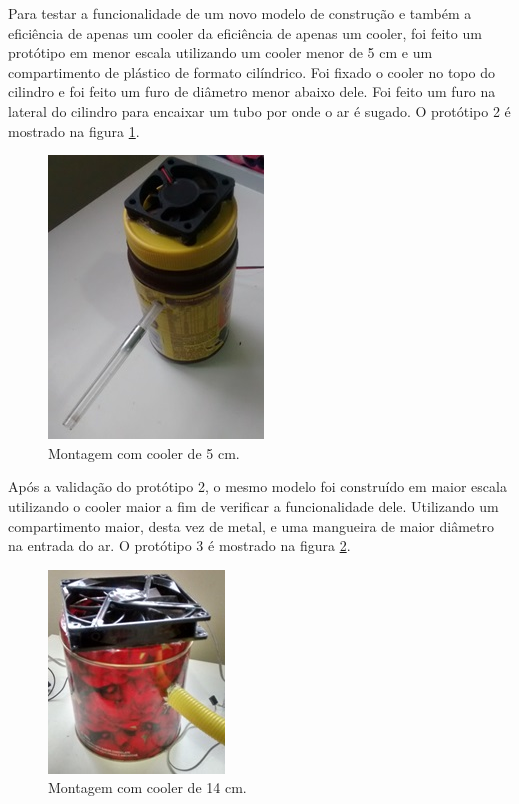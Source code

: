 		Para testar a funcionalidade de um novo modelo de construção e também a eficiência de apenas um cooler da eficiência de apenas um cooler, foi feito um protótipo em menor escala utilizando um cooler menor de 5 cm e um compartimento de plástico de formato cilíndrico. Foi fixado o cooler no topo do cilindro e foi feito um furo de diâmetro menor abaixo dele. Foi feito um furo na lateral do cilindro para encaixar um tubo por onde o ar é sugado. O protótipo 2 é mostrado na figura \ref{img:cooler_5cm}.

		\begin{figure}[H]
			\centering
			\includegraphics[scale=1]{figuras/asppc2_2.jpg}
			\caption{Montagem com cooler de 5 cm.}
			\label{img:cooler_5cm}
		\end{figure}

		Após a validação do protótipo 2, o mesmo modelo foi construído em maior escala utilizando o cooler maior a fim de verificar a funcionalidade dele. Utilizando um compartimento maior, desta vez de metal, e uma mangueira de maior diâmetro na entrada do ar. O protótipo 3 é mostrado na figura \ref{img:cooler_14cm}.

		\begin{figure}[H]
			\centering
			\includegraphics[scale=1]{figuras/asppc2_3.jpg}
			\caption{Montagem com cooler de 14 cm.}
			\label{img:cooler_14cm}
		\end{figure}

